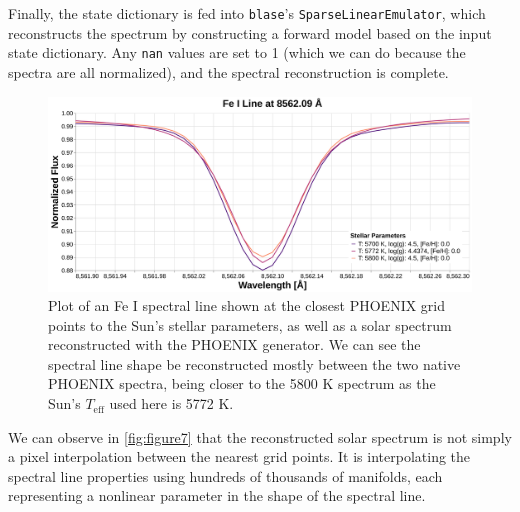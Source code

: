 \documentclass[twocolumn, linenumbers]{aastex631}
\begin{document}
Finally, the state dictionary is fed into \texttt{blase}'s \texttt{SparseLinearEmulator}, which reconstructs the spectrum by constructing a forward model based on the input state dictionary.
Any \texttt{nan} values are set to 1 (which we can do because the spectra are all normalized), and the spectral reconstruction is complete.
\begin{figure}
    \centering
    \includegraphics[width=\textwidth]{figure7}
    \caption{Plot of an Fe I spectral line shown at the closest PHOENIX grid points to the Sun's stellar parameters, as well as a solar spectrum reconstructed with the PHOENIX generator.
    We can see the spectral line shape be reconstructed mostly between the two native PHOENIX spectra, being closer to the 5800 K spectrum as the Sun's $T_{\mathrm{eff}}$ used here is 5772 K.}
    \label{fig:figure7}
\end{figure}
We can observe in \autoref{fig:figure7} that the reconstructed solar spectrum is not simply a pixel interpolation between the nearest grid points.
It is interpolating the spectral line properties using hundreds of thousands of manifolds, each representing a nonlinear parameter in the shape of the spectral line.
\end{document}
